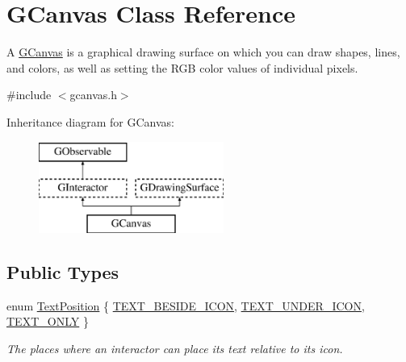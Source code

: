 \hypertarget{classsgl_1_1GCanvas}{}\section{G\+Canvas Class Reference}
\label{classsgl_1_1GCanvas}


A \mbox{\hyperlink{classsgl_1_1GCanvas}{G\+Canvas}} is a graphical drawing surface on which you can draw shapes, lines, and colors, as well as setting the R\+GB color values of individual pixels.  




{\ttfamily \#include $<$gcanvas.\+h$>$}

Inheritance diagram for G\+Canvas\+:\begin{figure}[H]
\begin{center}
\leavevmode
\includegraphics[height=3.000000cm]{classsgl_1_1GCanvas}
\end{center}
\end{figure}
\subsection*{Public Types}
\begin{DoxyCompactItemize}
\item 
enum \mbox{\hyperlink{classsgl_1_1GInteractor_a8e0d441725a81d2bbdebbea09078260e}{Text\+Position}} \{ \mbox{\hyperlink{classsgl_1_1GInteractor_a8e0d441725a81d2bbdebbea09078260ea4cd6f2e7d5a08d6f4dc052df2358f774}{T\+E\+X\+T\+\_\+\+B\+E\+S\+I\+D\+E\+\_\+\+I\+C\+ON}}, 
\mbox{\hyperlink{classsgl_1_1GInteractor_a8e0d441725a81d2bbdebbea09078260eaa88490f63d8de68d44c83bdb2ecde3b3}{T\+E\+X\+T\+\_\+\+U\+N\+D\+E\+R\+\_\+\+I\+C\+ON}}, 
\mbox{\hyperlink{classsgl_1_1GInteractor_a8e0d441725a81d2bbdebbea09078260ea39a6f388a30ac4fefb6eb13e846bc9f2}{T\+E\+X\+T\+\_\+\+O\+N\+LY}}
 \}
\begin{DoxyCompactList}\small\item\em The places where an interactor can place its text relative to its icon. \end{DoxyCompactList}\end{DoxyCompactItemize}
